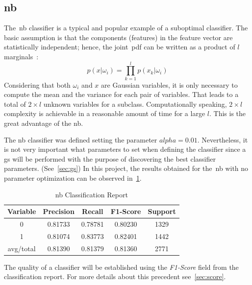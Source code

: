 \subsection{\acf{nb}}
The~\ac{nb} classifier is a typical and popular example of a suboptimal classifier. The basic assumption is that the components (features) in the feature vector are statistically independent; hence, the joint~\ac{pdf} can be written as a product of $l$ marginals~\cite{classif}:
\begin{equation}
	p(x|\omega_i)=\prod_{k=1}^{l}p(x_k|\omega_i)
	\label{ec:nb}
\end{equation}
Considering that both $\omega_i$ and $x$ are Gaussian variables, it is only necessary to compute the mean and the variance for each pair of variables. That leads to a total of $2\times l$ unknown variables for a subclass. Computationally speaking, $2\times l$ complexity is achievable in a reasonable amount of time for a large $l$. This is the great advantage of the \ac{nb}.\par
The \ac{nb} classifier was defined setting the parameter $alpha = 0.01$. Nevertheless, it is not very important what parameters to set when defining the classifier since a \ac{gs} will be performed with the purpose of discovering the best classifier parameters. (See~\cref{sec:gs})
In this project, the results obtained for the~\ac{nb} with no parameter optimization can be observed in~\cref{tab:nb1}.
\begin{table}[h!]
	\centering
	\begin{tabular}{||c c c c c||} 
		\hline
		Variable & Precision & Recall & F1-Score & Support \\ [0.5ex] 
		\hline\hline
		0 & 0.81733 & 0.78781 & 0.80230 & 1329 \\ 
		1 & 0.81074 & 0.83773 & 0.82401 & 1442 \\
		avg/total & 0.81390 & 0.81379 & 0.81360 & 2771 \\
		[1ex] 
		\hline
	\end{tabular}
		\caption{\acl{nb} Classification Report}
		\label{tab:nb1}
\end{table}
The quality of a classifier will be established using the \textit{F1-Score} field from the classification report. For more details about this precedent see~\cref{sec:score}.
